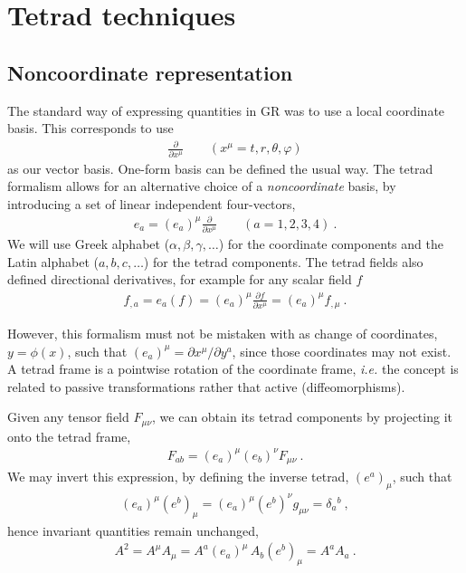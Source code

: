 
\chapter{Tetrad techniques} %
\label{AppendixTetradFormalism}


\section{Noncoordinate representation}
\label{AppendixTetradMetric}

The standard way of expressing quantities in GR was to use a local coordinate basis. This corresponds to use
\begin{align}
   \frac{\partial}{\partial x^\mu} \qquad (x^\mu = t, r, \theta, \varphi)
\end{align}
as our vector basis. One-form basis can be defined the usual way. The tetrad formalism allows for an alternative choice of a \emph{noncoordinate} basis, by introducing a set of linear independent four-vectors, 
\begin{align}
    e_a = (e_a)^\mu \frac{\partial}{\partial x^\mu} \qquad (a = 1, 2, 3, 4) ~.
\end{align}
We will use Greek alphabet ($\alpha,\beta,\gamma,\dots$) for the coordinate components and the Latin alphabet ($a,b,c,\dots$) for the tetrad components.
The tetrad fields also defined directional derivatives, for example for any scalar field $f$
\begin{align}
    f_{, a} = e_a ( f ) = (e_a)^\mu \frac{\partial f}{\partial x^\mu} =  (e_a)^\mu f_{,  \mu}  ~.
\end{align}

However, this formalism must not be mistaken with as change of coordinates, $y=\phi(x)$, such that $(e_a)^\mu = \partial x^\mu / \partial y^a$, since those coordinates may not exist.
A tetrad frame is a pointwise rotation of the coordinate frame, \emph{i.e.} the concept is related to passive transformations rather that active (diffeomorphisms).

Given any tensor field $F_{\mu\nu}$, we can obtain its tetrad components by projecting it onto the tetrad frame,
\begin{align}
    F_{ab} = (e_a)^\mu (e_b)^\nu F_{\mu\nu} ~.
\end{align}
We may invert this expression, by defining the inverse tetrad, $(e^a)_\mu$, such that
\begin{align}
    (e_a)^\mu (e^b)_\mu = (e_a)^\mu (e^b)^\nu g_{\mu\nu} = \delta_a{}^b ~,
\end{align}
hence invariant quantities remain unchanged,
\begin{align}
    A^2 = A^\mu A_\mu = A^a (e_a)^\mu \, A_b (e^b)_\mu = A^a A_a~.
\end{align}

